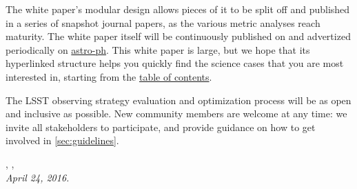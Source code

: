 \noindent The white paper's modular design allows pieces of it to be
split off and published in a series of snapshot journal papers, as the
various metric analyses reach maturity. The white paper itself will be
continuously published on
\href{https://github.com/LSSTScienceCollaborations/ObservingStrategy}{\GitHub}
and advertized periodically on \href{http://arxiv.org}{astro-ph}. This
white paper is large, but we hope that its hyperlinked structure helps
you quickly find the science cases that you are most interested in,
starting from the \hyperref[toc]{table of contents}.

\noindent The LSST observing strategy evaluation and optimization
process will be as open and inclusive as possible. New community members
are welcome at any time: we invite all stakeholders to participate, and
provide guidance on how to get involved in \autoref{sec:guidelines}.

\vspace{2\baselineskip}

{\raggedleft {}, ,  \\
 \medskip \hspace{0.8\linewidth} \it April 24, 2016.}

\clearpage
